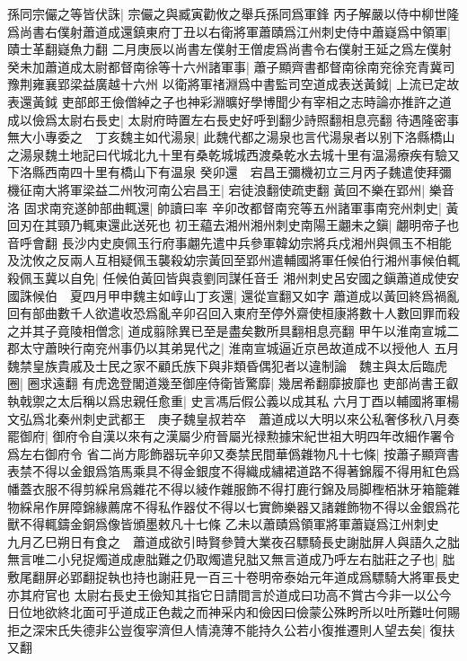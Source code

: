 孫同宗儼之等皆伏誅|{
	宗儼之與臧寅勸攸之舉兵孫同爲軍鋒}
丙子解嚴以侍中柳世隆爲尚書右僕射蕭道成還鎮東府丁丑以右衛將軍蕭賾爲江州刺史侍中蕭嶷爲中領軍|{
	賾士革翻嶷魚力翻}
二月庚辰以尚書左僕射王僧䖍爲尚書令右僕射王延之爲左僕射癸未加蕭道成太尉都督南徐等十六州諸軍事|{
	蕭子顯齊書都督南徐南兖徐兖青冀司豫荆雍襄郢梁益廣越十六州}
以衛將軍禇淵爲中書監司空道成表送黃鉞|{
	上流已定故表還黃鉞}
吏部郎王儉僧綽之子也神彩淵曠好學博聞少有宰相之志時論亦推許之道成以儉爲太尉右長史|{
	太尉府時置左右長史好呼到翻少詩照翻相息亮翻}
待遇隆密事無大小專委之　丁亥魏主如代湯泉|{
	此魏代都之湯泉也言代湯泉者以别下洛縣橋山之湯泉魏土地記曰代城北九十里有桑乾城城西渡桑乾水去城十里有温湯療疾有驗又下洛縣西南四十里有橋山下有温泉}
癸卯還　宕昌王彌機初立三月丙子魏遣使拜彌機征南大將軍梁益二州牧河南公宕昌王|{
	宕徒浪翻使疏吏翻}
黃回不樂在郢州|{
	樂音洛}
固求南兖遂帥部曲輒還|{
	帥讀曰率}
辛卯改都督南兖等五州諸軍事南兖州刺史|{
	黃回刃在其頸乃輒東還此送死也}
初王藴去湘州湘州刺史南陽王翽未之鎭|{
	翽明帝子也音呼會翻}
長沙内史庾佩玉行府事翽先遣中兵參軍韓幼宗將兵戍湘州與佩玉不相能及沈攸之反兩人互相疑佩玉襲殺幼宗黃回至郢州遣輔國將軍任候伯行湘州事候伯輒殺佩玉冀以自免|{
	任候伯黃回皆與袁劉同謀任音壬}
湘州刺史呂安國之鎭蕭道成使安國誅候伯　夏四月甲申魏主如崞山丁亥還|{
	還從宣翻又如字}
蕭道成以黃回終爲禍亂回有部曲數千人欲遣收恐爲亂辛卯召回入東府至停外齋使桓康將數十人數回罪而殺之并其子竟陵相僧念|{
	道成翦除異已至是盡矣數所具翻相息亮翻}
甲午以淮南宣城二郡太守蕭映行南兖州事仍以其弟晃代之|{
	淮南宣城逼近京邑故道成不以授他人}
五月魏禁皇族貴戚及士民之家不顧氏族下與非類昏偶犯者以違制論　魏主與太后臨虎圈|{
	圈求遠翻}
有虎逸登閣道幾至御座侍衛皆驚靡|{
	幾居希翻靡披靡也}
吏部尚書王叡執戟禦之太后稱以爲忠親任愈重|{
	史言馮后假公義以成其私}
六月丁酉以輔國將軍楊文弘爲北秦州刺史武都王　庚子魏皇叔若卒　蕭道成以大明以來公私奢侈秋八月奏罷御府|{
	御府令自漢以來有之漢屬少府晉屬光禄勲據宋紀世祖大明四年改細作署令爲左右御府令}
省二尚方彫飾器玩辛卯又奏禁民間華僞雜物凡十七條|{
	按蕭子顯齊書表禁不得以金銀爲箔馬乘具不得金銀度不得織成繡裙道路不得著錦履不得用紅色爲幡蓋衣服不得剪綵帛爲雜花不得以綾作雜服飾不得打鹿行錦及局脚檉栢牀牙箱籠雜物綵帛作屏障錦緣薦席不得私作器仗不得以七實飾樂器又諸雜飾物不得以金銀爲花獸不得輒鑄金銅爲像皆頒墨敕凡十七條}
乙未以蕭賾爲領軍將軍蕭嶷爲江州刺史　九月乙巳朔日有食之　蕭道成欲引時賢參贊大業夜召驃騎長史謝朏屏人與語久之朏無言唯二小兒捉燭道成慮朏難之仍取燭遣兒朏又無言道成乃呼左右朏莊之子也|{
	朏敷尾翻屏必郢翻捉執也持也謝莊見一百三十卷明帝泰始元年道成爲驃騎大將軍長史亦其府官也}
太尉右長史王儉知其指它日請間言於道成曰功高不賞古今非一以公今日位地欲終北面可乎道成正色裁之而神采内和儉因曰儉蒙公殊盻所以吐所難吐何賜拒之深宋氏失德非公豈復寜濟但人情澆薄不能持久公若小復推遷則人望去矣|{
	復扶又翻}
